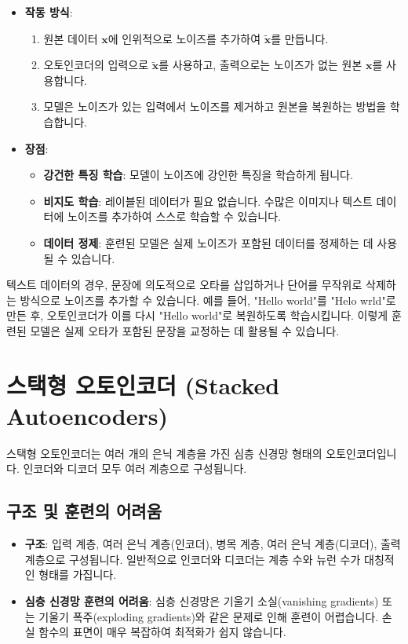 \documentclass[11pt,a4paper]{article}
\theoremstyle{definition}
\begin{document}
\begin{itemize}
    \item \textbf{작동 방식}:
        \begin{enumerate}
            \item 원본 데이터 $\mathbf{x}$에 인위적으로 노이즈를 추가하여 $\tilde{\mathbf{x}}$를 만듭니다.
            \item 오토인코더의 입력으로 $\tilde{\mathbf{x}}$를 사용하고, 출력으로는 노이즈가 없는 원본 $\mathbf{x}$를 사용합니다.
            \item 모델은 노이즈가 있는 입력에서 노이즈를 제거하고 원본을 복원하는 방법을 학습합니다.
        \end{enumerate}
    \item \textbf{장점}:
        \begin{itemize}
            \item \textbf{강건한 특징 학습}: 모델이 노이즈에 강인한 특징을 학습하게 됩니다.
            \item \textbf{비지도 학습}: 레이블된 데이터가 필요 없습니다. 수많은 이미지나 텍스트 데이터에 노이즈를 추가하여 스스로 학습할 수 있습니다.
            \item \textbf{데이터 정제}: 훈련된 모델은 실제 노이즈가 포함된 데이터를 정제하는 데 사용될 수 있습니다.
        \end{itemize}
\end{itemize}

\begin{examplebox}
텍스트 데이터의 경우, 문장에 의도적으로 오타를 삽입하거나 단어를 무작위로 삭제하는 방식으로 노이즈를 추가할 수 있습니다. 예를 들어, "Hello world"를 "Helo wrld"로 만든 후, 오토인코더가 이를 다시 "Hello world"로 복원하도록 학습시킵니다. 이렇게 훈련된 모델은 실제 오타가 포함된 문장을 교정하는 데 활용될 수 있습니다.
\end{examplebox}

\newpage
\section{스택형 오토인코더 (Stacked Autoencoders)}
스택형 오토인코더는 여러 개의 은닉 계층을 가진 심층 신경망 형태의 오토인코더입니다. 인코더와 디코더 모두 여러 계층으로 구성됩니다.

\subsection{구조 및 훈련의 어려움}
\begin{itemize}
    \item \textbf{구조}: 입력 계층, 여러 은닉 계층(인코더), 병목 계층, 여러 은닉 계층(디코더), 출력 계층으로 구성됩니다. 일반적으로 인코더와 디코더는 계층 수와 뉴런 수가 대칭적인 형태를 가집니다.
    \item \textbf{심층 신경망 훈련의 어려움}: 심층 신경망은 기울기 소실(vanishing gradients) 또는 기울기 폭주(exploding gradients)와 같은 문제로 인해 훈련이 어렵습니다. 손실 함수의 표면이 매우 복잡하여 최적화가 쉽지 않습니다.
\end{itemize}
\end{document}
